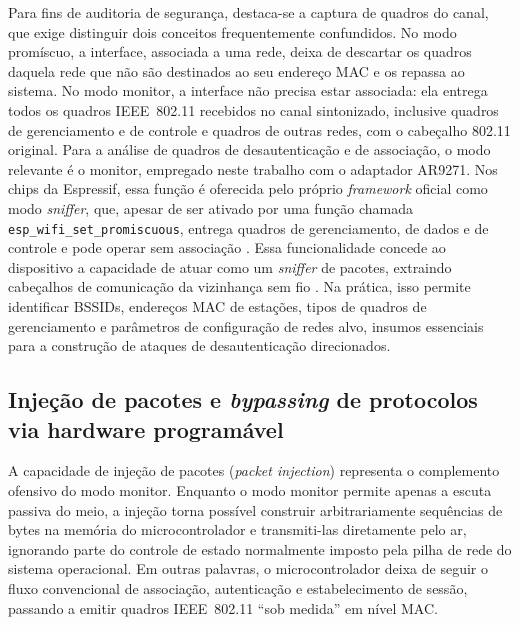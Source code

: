 Para fins de auditoria de segurança, destaca-se a captura de quadros do canal, que exige distinguir dois conceitos frequentemente confundidos. No modo promíscuo, a interface, associada a uma rede, deixa de descartar os quadros daquela rede que não são destinados ao seu endereço MAC e os repassa ao sistema. No modo monitor, a interface não precisa estar associada: ela entrega todos os quadros IEEE~802.11 recebidos no canal sintonizado, inclusive quadros de gerenciamento e de controle e quadros de outras redes, com o cabeçalho 802.11 original. Para a análise de quadros de desautenticação e de associação, o modo relevante é o monitor, empregado neste trabalho com o adaptador AR9271. Nos chips da Espressif, essa função é oferecida pelo próprio \textit{framework} oficial como modo \textit{sniffer}, que, apesar de ser ativado por uma função chamada \texttt{esp\_wifi\_set\_promiscuous}, entrega quadros de gerenciamento, de dados e de controle e pode operar sem associação \cite{EspressifWifiModes}. Essa funcionalidade concede ao dispositivo a capacidade de atuar como um \textit{sniffer} de pacotes, extraindo cabeçalhos de comunicação da vizinhança sem fio \cite{Lima2025}. Na prática, isso permite identificar BSSIDs, endereços MAC de estações, tipos de quadros de gerenciamento e parâmetros de configuração de redes alvo, insumos essenciais para a construção de ataques de desautenticação direcionados.

\subsection{Injeção de pacotes e \textit{bypassing} de protocolos via hardware programável}

A capacidade de injeção de pacotes (\textit{packet injection}) representa o complemento ofensivo do modo monitor. Enquanto o modo monitor permite apenas a escuta passiva do meio, a injeção torna possível construir arbitrariamente sequências de bytes na memória do microcontrolador e transmiti-las diretamente pelo ar, ignorando parte do controle de estado normalmente imposto pela pilha de rede do sistema operacional. Em outras palavras, o microcontrolador deixa de seguir o fluxo convencional de associação, autenticação e estabelecimento de sessão, passando a emitir quadros IEEE~802.11 “sob medida” em nível MAC.

